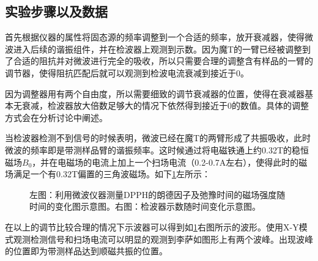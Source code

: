 \documentclass[aps,pre,12pt,preprint,onecolumn,showpacs,showkeys,UTF8]{article}
\begin{document}
\subsection{实验步骤以及数据}

首先根据仪器的属性将固态源的频率调整到一个合适的频率，放开衰减器，使得微波进入后续的谐振组件，并在检波器上观测到示数。因为魔T的一臂已经被调整到了合适的阻抗并对微波进行完全的吸收，所以只需要合理的调整含有样品的一臂的调节器，使得阻抗匹配后就可以观测到检波电流衰减到接近于0。

因为调整器用有两个自由度，所以需要细致的调节衰减器的位置，使得在衰减器基本无衰减，检波器放大倍数足够大的情况下依然得到接近于0的数值。具体的调整方式会在分析讨论中阐述。

当检波器检测不到信号的时候表明，微波已经在魔T的两臂形成了共振吸收，此时微波的频率即是带测样品臂的谐振频率。这时候通过将电磁铁通上约0.32T的稳恒磁场$B_0$，并在电磁场的电流上加上一个扫场电流（0.2-0.7A左右），使得此时的磁场满足一个有0.32T偏置的三角波磁场。如下\ref{fig:exp2}左所示：

\begin{figure}[h]
	\begin{center}
		\caption{\label{fig:exp2}左图：利用微波仪器测量DPPH的朗德因子及弛豫时间的磁场强度随时间的变化图示意图。右图：检波器示数随时间变化示意图。}
	\end{center}
\end{figure}

在以上的调节比较合理的情况下示波器可以得到如\ref{fig:exp2}右图所示的波形。使用X-Y模式观测检测信号和扫场电流可以明显的观测到李萨如图形上有两个波峰。出现波峰的位置即为带测样品达到顺磁共振的位置。
\end{document}

